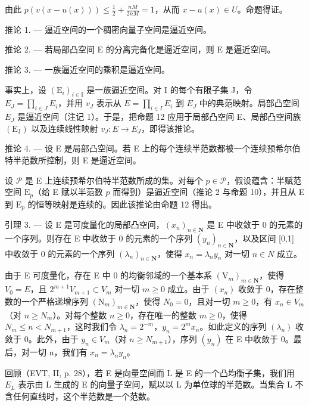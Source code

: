 由此 \(p(v(x - u(x))) \leqslant \frac{1}{2} + \frac{nM}{2nM} = 1\)，从而 \(x - u(x) \in U\)。命题得证。

推论 1. --- 逼近空间的一个稠密向量子空间是逼近空间。

推论 2. --- 若局部凸空间 E 的分离完备化是逼近空间，则 E 是逼近空间。

推论 3. --- 一族逼近空间的乘积是逼近空间。

事实上，设 \((\mathrm{E}_{i})_{i\in\mathrm{I}}\) 是一族逼近空间。对 I 的每个有限子集 J，令 \(E_{J}=\prod_{i\in J}E_{i}\)，并用 \(v_{J}\) 表示从 \(E=\prod_{i\in I}E_{i}\) 到 \(E_{J}\) 中的典范映射。局部凸空间 \(E_{J}\) 是逼近空间（注记 1）。于是，把命题 12 应用于局部凸空间 E、局部凸空间族 \((\mathrm{E}_{\mathrm{J}})\) 以及连续线性映射 \(v_{J}:E\to E_{J}\)，即得该推论。

推论 4. --- 设 E 是局部凸空间。若 E 上的每个连续半范数都被一个连续预希尔伯特半范数所控制，则 E 是逼近空间。

设 \(\mathcal{P}\) 是 E 上连续预希尔伯特半范数所成的集。对每个 \(p \in \mathcal{P}\)，假设蕴含：半赋范空间 \(\mathrm{E}_p\)（给 E 赋以半范数 \(p\) 而得到）是逼近空间（推论 2 与命题 10），并且从 E 到 \(\mathrm{E}_p\) 的恒等映射是连续的。因此该推论由命题 12 得出。

引理 3. --- 设 E 是可度量化的局部凸空间，\((x_{n})_{n\in\mathbf{N}}\) 是 E 中收敛于 0 的元素的一个序列。则存在 E 中收敛于 0 的元素的一个序列 \((y_{n})_{n\in\mathbf{N}}\)，以及区间 [0,1] 中收敛于 0 的元素的一个序列 \((\lambda_{n})_{n\in\mathbf{N}}\)，使得 \(x_{n}=\lambda_{n}y_{n}\) 对一切 \(n\in N\) 成立。

由于 E 可度量化，存在 E 中 0 的均衡邻域的一个基本系 \((\mathrm{V}_{m})_{m\in\mathbf{N}}\)，使得 \(V_{0}=E\)，且 \(2^{m+1}V_{m+1}\subset V_{m}\) 对一切 \(m\geqslant0\) 成立。由于 \((x_{n})\) 收敛于 0，存在整数的一个严格递增序列 \((\mathrm{N}_{m})_{m\in\mathbf{N}}\)，使得 \(N_{0}=0\)，且对一切 \(m\geqslant0\)，有 \(x_{n}\in V_{m}\)（对 \(n\geqslant N_{m}\)）。对每个整数 \(n\geqslant0\)，存在唯一的整数 \(m\geqslant0\)，使得 \(N_{m}\leqslant n<N_{m+1}\)，这时我们令 \(\lambda_{n}=2^{-m}\)，\(y_{n}=2^{m}x_{n}\)。如此定义的序列 \((\lambda_{n})\) 收敛于 0。此外，由于 \(y_{n}\in V_{m}\)（对 \(n\geqslant N_{m+1}\)），序列 \((y_{n})\) 在 E 中收敛于 0。最后，对一切 n，我们有 \(x_{n}=\lambda_{n}y_{n}\)。

回顾（EVT, II, p. 28），若 E 是向量空间而 L 是 E 的一个凸均衡子集，我们用 \(E_{L}\) 表示由 L 生成的 E 的向量子空间，赋以以 L 为单位球的半范数。当集合 L 不含任何直线时，这个半范数是一个范数。

